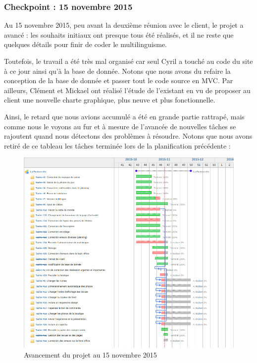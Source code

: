 \documentclass[11pt]{report}
\begin{document}
\subsubsection*{Checkpoint : 15 novembre 2015}
\par Au 15 novembre 2015, peu avant la deuxième réunion avec le client, le
projet a avancé : les souhaits initiaux ont presque tous été réalisés, et il ne 
reste que quelques détails pour finir de coder le multilinguisme. \\
\par Toutefois, le travail a été très mal organisé car seul Cyril a touché au
code du site à ce jour ainsi qu'à la base de donnée. Notons que nous avons du
refaire la conception de la base de donnée et passer tout le code source en 
MVC. 
Par
ailleurs, Clément et Mickael ont réalisé l'étude de l'existant en vu de proposer
au client une nouvelle charte graphique, plus neuve et plus fonctionnelle. \\
\par Ainsi, le retard que nous avions accumulé a été en grande partie rattrapé,
mais comme nous le voyons au fur et à mesure de l'avancée de nouvelles tâches se
rajoutent quand nous détectons des problèmes à résoudre. Notons que nous avons
retiré de ce tableau les tâches terminée lors de la planification précédente :

\begin{landscape}
\begin{figure}[t]
    \caption{Avancement du projet au 15 novembre 2015}
\includegraphics[scale=0.5]{include/gantt15-11.png}
\end{figure}
\end{landscape}
\end{document}
